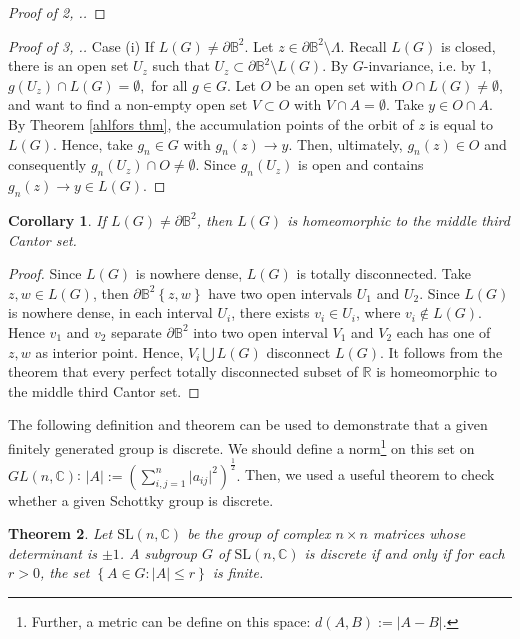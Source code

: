 \documentclass[12pt,oneside]{sfsuthesis}
\theoremstyle{plain} %
\newtheorem{theorem}{Theorem}[chapter]
\newtheorem{corollary}[theorem]{Corollary}
\theoremstyle{definition}  %
\theoremstyle{remark}  %
\theoremstyle{plain}
\begin{document}
{\begin{proof}[Proof of 2, \cite{series2008hyperbolic}.]
\end{proof}
\begin{proof}[Proof of 3, \cite{series2008hyperbolic}.]
Case (i) If $L(G)\neq \partial \mathbb{B}^2$. Let $z\in \partial \mathbb{B}^2\setminus \Lambda$. Recall $L(G)$ is closed, there is an open set $U_z$ such that $U_z\subset \partial \mathbb{B}^2\setminus L(G)$. By $G$-invariance, i.e. by 1, $g(U_z)\cap L(G)=\emptyset,$ for all $g\in G.$ Let $O$ be an open set with $O\cap L(G)\neq \emptyset$, and want to find a non-empty open set $V\subset O$ with $V\cap A =\emptyset$. Take $y\in O\cap A.$ By Theorem \ref{ahlfors thm}, the accumulation points of the orbit of $z$ is equal to $L(G)$. Hence, take $g_n\in G$ with $g_n(z)\to y$. Then, ultimately, $g_n(z)\in O$ and consequently $g_n(U_z)\cap O \neq \emptyset$. Since $g_n(U_z)$ is open and contains $g_n(z)\to y \in L(G)$.
\end{proof}
\begin{corollary}\cite{series2008hyperbolic}
If $L(G)\neq \partial \mathbb{B}^2$, then $L(G)$ is homeomorphic to the middle third Cantor set. 
\end{corollary}
\begin{proof}
Since $L(G)$ is nowhere dense, $L(G)$ is totally disconnected. Take $z,w\in L(G)$, then $\partial \mathbb{B}^2\left\lbrace z,w \right\rbrace$ have two open intervals $U_1$ and $U_2$. Since $L(G)$ is nowhere dense, in each interval $U_i$, there exists $v_i\in U_i$, where $v_i\notin L(G).$ Hence $v_1$ and $v_2$ separate $\partial \mathbb{B}^2$ into two open interval $V_1$ and $V_2$ each has one of $z,w$ as interior point. Hence, $V_i\bigcup L(G)$ disconnect $L(G)$. It follows from the theorem that every perfect totally disconnected subset of $\mathbb{R}$ is homeomorphic to the middle third Cantor set.
\end{proof}


The following definition and theorem can be used to demonstrate that a given finitely generated group is discrete. We should define a norm\footnote{Further, a metric can be define on this space: $
d(A,B):=\vert A -B \vert.
$} on this set on $GL(n,\mathbb{C})$:
$
\left\vert A \right\vert := \left( \sum\limits_{i,j=1}^n \vert a_{ij}\vert^2 \right)^{\frac{1}{2}}.
$
Then, we used a useful theorem\cite[See Theorem 5.3.3 ]{ratcliffe1994foundations} to check whether a given Schottky group is discrete.
\begin{theorem}\label{Theorem 5.3.3 ratcliffe}
Let $\text{SL}(n,\mathbb{C})$ be the group of complex $n\times n$ matrices whose determinant is $\pm 1$. A subgroup $G$ of $\text{SL}(n,\mathbb{C})$ is discrete if and only if for each $r>0$, the set $\left\lbrace A\in G:\vert A \vert\leq r \right\rbrace$ is finite.
\end{theorem}

}
\end{document}
